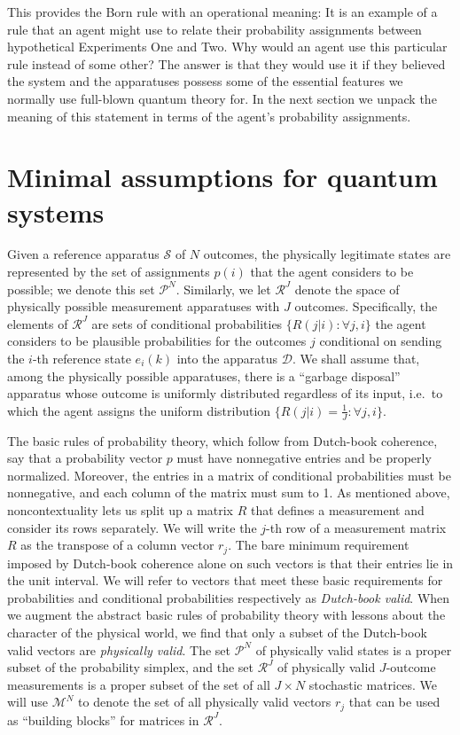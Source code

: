 \documentclass[%
 reprint,superscriptaddress,
 amsmath,amssymb,
 aps,twocolumn,pra
]{revtex4-1}
\newcommand{\tit}[1]{\textit{#1}}
\newcommand{\onestage}{{One}}
\newcommand{\twostage}{{Two}}
\begin{document}
This provides the Born rule with an operational meaning: It is an example of a rule that an agent might use to relate their probability assignments between hypothetical Experiments \onestage{} and \twostage. Why would an agent use this particular rule instead of some other? The answer is that they would use it if they believed the system and the apparatuses possess some of the essential features we normally use full-blown quantum theory for. In the next section we unpack the meaning of this statement in terms of the agent's probability assignments.

\section{Minimal assumptions for quantum systems \label{sec:core}}

Given a reference apparatus $\mathcal{S}$ of $N$ outcomes, the physically legitimate states are represented by the set of assignments $p(i)$ that the agent considers to be possible; we denote this set $\mathcal{P}^N$. Similarly, we let $\mathcal{R}^J$ denote the space of physically possible measurement apparatuses with $J$ outcomes. Specifically, the elements of $\mathcal{R}^J$ are sets of conditional probabilities $\{R(j|i) : \forall j,i \}$ the agent considers to be plausible probabilities for the outcomes $j$ conditional on sending the $i$-th reference state $e_i(k)$ into the apparatus $\mathcal{D}$. We shall assume that, among the physically possible apparatuses, there is a ``garbage disposal'' apparatus whose outcome is uniformly distributed regardless of its input, i.e.\ to which the agent assigns the uniform distribution $\{ R(j|i)=\frac{1}{J} :  \forall j,i \}$.

The basic rules of probability theory, which follow from Dutch-book coherence, say that a probability vector $p$ must have nonnegative entries and be properly normalized. Moreover, the entries in a matrix of conditional probabilities must be nonnegative, and each column of the matrix must sum to 1. As mentioned above, noncontextuality lets us split up a matrix $R$ that defines a measurement and consider its rows separately. We will write the $j$-th row of a measurement matrix $R$ as the transpose of a column vector $r_j$. The bare minimum requirement imposed by Dutch-book coherence alone on such vectors is that their entries lie in the unit interval. We will refer to vectors that meet these basic requirements for probabilities and conditional probabilities respectively as \tit{Dutch-book valid}. When we augment the abstract basic rules of probability theory with lessons about the character of the physical world, we find that only a subset of the Dutch-book valid vectors are \tit{physically valid}. The set $\mathcal{P}^N$ of physically valid states is a proper subset of the probability simplex, and the set $\mathcal{R}^J$ of physically valid $J$-outcome measurements is a proper subset of the set of all $J \times N$ stochastic matrices. We will use $\mathcal{M}^N$ to denote the set of all physically valid vectors $r_j$ that can be used as ``building blocks'' for matrices in $\mathcal{R}^J$.
\end{document}
